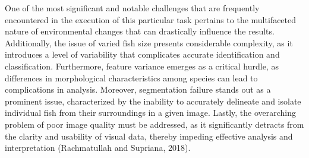 One of the most significant and notable challenges that are frequently encountered in the execution of this particular task pertains to the multifaceted nature of environmental changes that can drastically influence the results. Additionally, the issue of varied fish size presents considerable complexity, as it introduces a level of variability that complicates accurate identification and classification. Furthermore, feature variance emerges as a critical hurdle, as differences in morphological characteristics among species can lead to complications in analysis. Moreover, segmentation failure stands out as a prominent issue, characterized by the inability to accurately delineate and isolate individual fish from their surroundings in a given image. Lastly, the overarching problem of poor image quality must be addressed, as it significantly detracts from the clarity and usability of visual data, thereby impeding effective analysis and interpretation (Rachmatullah and Supriana, 2018).

